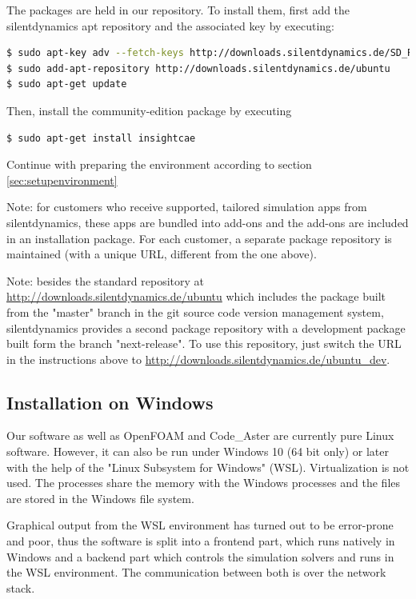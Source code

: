 The packages are held in our repository. To install them, first add the silentdynamics apt repository and the associated key by executing:

\begin{lstlisting}[language=bash]
$ sudo apt-key adv --fetch-keys http://downloads.silentdynamics.de/SD_REPOSITORIES_PUBLIC_KEY.gpg
$ sudo add-apt-repository http://downloads.silentdynamics.de/ubuntu
$ sudo apt-get update
\end{lstlisting}

Then, install the community-edition package by executing

\begin{lstlisting}[language=bash]
$ sudo apt-get install insightcae
\end{lstlisting}

Continue with preparing the environment according to section \ref{sec:setupenvironment}

Note: for customers who receive supported, tailored simulation apps from silentdynamics, these apps are bundled into add-ons and the add-ons are included in an installation package.
For each customer, a separate package repository is maintained (with a unique URL, different from the one above).

Note: besides the standard repository at \url{http://downloads.silentdynamics.de/ubuntu} which includes the package built from the "master" branch in the git source code version management system, silentdynamics provides a second package repository with a development package built form the branch "next-release".
To use this repository, just switch the URL in the instructions above to
\url{http://downloads.silentdynamics.de/ubuntu_dev}.

\subsection{Installation on Windows}
Our software as well as OpenFOAM and Code\_Aster are currently pure Linux software. 
However, it can also be run under Windows 10 (64 bit only) or later with the help of the "Linux Subsystem for Windows" (WSL).
Virtualization is not used. 
The processes share the memory with the Windows processes and the files are stored in the Windows file system. 

Graphical output from the WSL environment has turned out to be error-prone and poor, thus the software is split into a frontend part, which runs natively in Windows and a backend part which controls the simulation solvers and runs in the WSL environment.
The communication between both is over the network stack.

